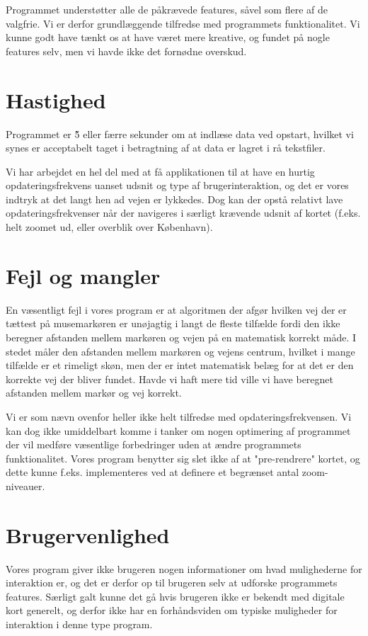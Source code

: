 Programmet understøtter alle de påkrævede features, såvel som flere af de valgfrie. Vi er derfor grundlæggende tilfredse med programmets funktionalitet. Vi kunne godt have tænkt os at have været mere kreative, og fundet på nogle features selv, men vi havde ikke det fornødne overskud.

\section{Hastighed}

Programmet er \~5 eller færre sekunder om at indlæse data ved opstart, hvilket vi synes er acceptabelt taget i betragtning af at data er lagret i rå tekstfiler.

Vi har arbejdet en hel del med at få applikationen til at have en hurtig opdateringsfrekvens uanset udsnit og type af brugerinteraktion, og det er vores indtryk at det langt hen ad vejen er lykkedes. Dog kan der opstå relativt lave opdateringsfrekvenser når der navigeres i særligt krævende udsnit af kortet (f.eks. helt zoomet ud, eller overblik over København).

\section{Fejl og mangler}

En væsentligt fejl i vores program er at algoritmen der afgør hvilken vej der er tættest på musemarkøren er unøjagtig i langt de fleste tilfælde fordi den ikke beregner afstanden mellem markøren og vejen på en matematisk korrekt måde. I stedet måler den afstanden mellem markøren og vejens centrum, hvilket i mange tilfælde er et rimeligt skøn, men der er intet matematisk belæg for at det er den korrekte vej der bliver fundet. Havde vi haft mere tid ville vi have beregnet afstanden mellem markør og vej korrekt.

Vi er som nævn ovenfor heller ikke helt tilfredse med opdateringsfrekvensen. Vi kan dog ikke umiddelbart komme i tanker om nogen optimering af programmet der vil medføre væsentlige forbedringer uden at ændre programmets funktionalitet. Vores program benytter sig slet ikke af at "pre-rendrere" kortet, og dette kunne f.eks. implementeres ved at definere et begrænset antal zoom-niveauer.

\section{Brugervenlighed}

Vores program giver ikke brugeren nogen informationer om hvad mulighederne for interaktion er, og det er derfor op til brugeren selv at udforske programmets features. Særligt galt kunne det gå hvis brugeren ikke er bekendt med digitale kort generelt, og derfor ikke har en forhåndsviden om typiske muligheder for interaktion i denne type program.